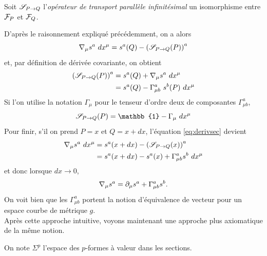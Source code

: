 \documentclass[a4paper,11pt]{report}
\begin{document}
                 \begin{definition}
                    Soit $\S_{P\to Q}$ l'\textit{opérateur de transport parallèle infinitésimal} un isomorphisme entre $\F_P$ et $\F_Q$.
                 \end{definition}
                 
                 D'après le raisonnement expliqué précédemment, on a alors
                 \begin{equation}\label{eq:derivsec}
                     \nabla_\mu s^a~dx^\mu = s^a(Q)-\left(\S_{P\to Q}(P)\right)^a
                 \end{equation}
                 et, par définition de dérivée covariante, on obtient
                 \begin{align}
                     \left(\S_{P\to Q}(P)\right)^a &= s^a(Q) + \nabla_\mu s^a~dx^\mu\\
                     &= s^a(Q) - \Gamma^a_{\mu b}~ s^b(P) ~dx^\mu
                 \end{align}
                 Si l'on utilise la notation $\Gamma_\mu$ pour le tenseur d'ordre deux de composantes $\Gamma^a_{\mu b}$, 
                 \begin{equation}
                     \S_{P\to Q}(P) = \mathbb{1} - \Gamma_\mu~dx^\mu
                 \end{equation}
                 Pour finir, s'il on prend $P = x$ et $Q = x+dx$, l'équation \ref{eq:derivsec} devient
                 \begin{align}
                      \nabla_\mu s^a~dx^\mu &= s^a(x+dx)-\left(\S_{P\to Q}(x)\right)^a\\
                      &= s^a(x+dx)-s^a(x)+\Gamma^a_{\mu b}s^b~dx^\mu
                 \end{align}
                 et donc lorsque $dx\to0$,
                 \begin{equation}
                     \nabla_\mu s^a = \p_\mu s^a+\Gamma^a_{\mu b}s^b.
                 \end{equation}
                 On voit bien que les $\Gamma^a_{\mu b}$ portent la notion d'équivalence de vecteur pour un espace courbe de métrique $g$. \\
                 
                 Après cette approche intuitive, voyons maintenant une approche plus axiomatique de la même notion.
                 
                 \begin{definition}
                    On note $\Sigma^p$ l'espace des $p$-formes à valeur dans les sections.
                 \end{definition}
                 
\end{document}
